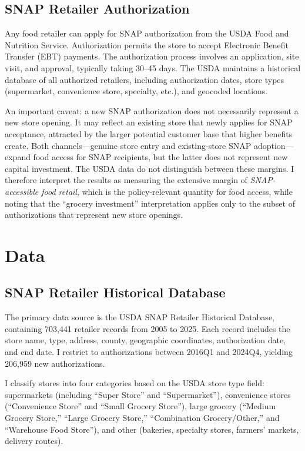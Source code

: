 \documentclass[12pt]{article}
\begin{document}
\subsection{SNAP Retailer Authorization}

Any food retailer can apply for SNAP authorization from the USDA Food and Nutrition Service. Authorization permits the store to accept Electronic Benefit Transfer (EBT) payments. The authorization process involves an application, site visit, and approval, typically taking 30--45 days. The USDA maintains a historical database of all authorized retailers, including authorization dates, store types (supermarket, convenience store, specialty, etc.), and geocoded locations.

An important caveat: a new SNAP authorization does not necessarily represent a new store opening. It may reflect an existing store that newly applies for SNAP acceptance, attracted by the larger potential customer base that higher benefits create. Both channels---genuine store entry and existing-store SNAP adoption---expand food access for SNAP recipients, but the latter does not represent new capital investment. The USDA data do not distinguish between these margins. I therefore interpret the results as measuring the extensive margin of \textit{SNAP-accessible food retail}, which is the policy-relevant quantity for food access, while noting that the ``grocery investment'' interpretation applies only to the subset of authorizations that represent new store openings.

\section{Data}

\subsection{SNAP Retailer Historical Database}

The primary data source is the USDA SNAP Retailer Historical Database, containing 703,441 retailer records from 2005 to 2025. Each record includes the store name, type, address, county, geographic coordinates, authorization date, and end date. I restrict to authorizations between 2016Q1 and 2024Q4, yielding 206,959 new authorizations.

I classify stores into four categories based on the USDA store type field: supermarkets (including ``Super Store'' and ``Supermarket''), convenience stores (``Convenience Store'' and ``Small Grocery Store''), large grocery (``Medium Grocery Store,'' ``Large Grocery Store,'' ``Combination Grocery/Other,'' and ``Warehouse Food Store''), and other (bakeries, specialty stores, farmers' markets, delivery routes).
\end{document}
